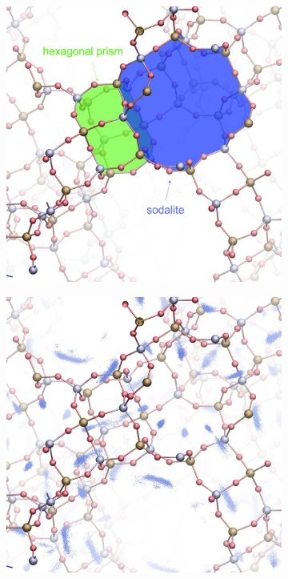 \documentclass[main.tex]{subfiles}
\begin{document}
\begin{figure}
	\centering
	\hfill\begin{subfigure}{0.45\columnwidth}
		\centering
		\includegraphics[width=\columnwidth]{figures/cations/FAU1_cages_text.jpg}
		\label{fig:FAUdetail}
	\end{subfigure}\hfill%
	\begin{subfigure}{0.45\columnwidth}
		\centering
		\includegraphics[width=\columnwidth]{figures/cations/FAU1_density.jpg}
		\label{fig:FAUdensity}
	\end{subfigure}\hfill


\end{figure}
\end{document}
